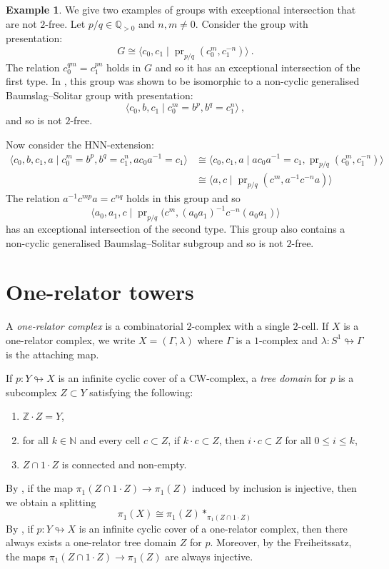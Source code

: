 \documentclass[11pt, a4paper]{amsart}
\theoremstyle{definition}
\newtheorem{example}[theorem]{Example}
\newcommand{\isom}{\cong}
\newcommand{\N}{\mathbb{N}}
\newcommand{\Z}{\mathbb{Z}}
\newcommand{\Q}{\mathbb{Q}}
\def\immerses{\looparrowright}
\DeclareMathOperator{\pr}{pr}
\begin{document}
\begin{example}
We give two examples of groups with exceptional intersection that are not $2$-free. Let $p/q\in \Q_{>0}$ and $n, m\neq 0$. Consider the group with presentation:
\[
G \isom \langle c_0, c_1 \mid \pr_{p/q}(c_0^{m}, c_1^{-n})\rangle~.
\]
The relation $c_0^{qm} = c_1^{pn}$ holds in $G$ and so it has an exceptional intersection of the first type. In \cite{meskin_73}, this group was shown to be isomorphic to a non-cyclic generalised Baumslag--Solitar group with presentation:
\[
\langle c_0, b, c_1 \mid c_0^{m} = b^{p}, b^{q} = c_1^{n}\rangle~,
\]
and so is not $2$-free.

Now consider the HNN-extension:
\begin{align*}
\langle c_0, b, c_1 , a\mid c_0^{m} = b^{p}, b^{q} = c_1^{n}, ac_0a^{-1} = c_1\rangle &\isom \langle c_0, c_1, a \mid ac_0a^{-1} = c_1, \pr_{p/q}(c_0^m, c_1^{-n}) \rangle \\
	&\isom \langle a, c \mid \pr_{p/q}(c^m, a^{-1}c^{-n}a)\rangle
\end{align*}
The relation $a^{-1}c^{mp}a = c^{nq}$ holds in this group and so
\[
\langle a_0, a_1, c \mid \pr_{p/q}(c^m, (a_0a_1)^{-1}c^{-n}(a_0a_1)\rangle
\]
has an exceptional intersection of the second type. This group also contains a non-cyclic generalised Baumslag--Solitar subgroup and so is not $2$-free.
\end{example}


\section{One-relator towers}


A \emph{one-relator complex} is a combinatorial $2$-complex with a single $2$-cell. If $X$ is a one-relator complex, we write $X = (\Gamma, \lambda)$ where $\Gamma$ is a $1$-complex and $\lambda:S^1\immerses \Gamma$ is the attaching map.

If $p:Y\immerses X$ is an infinite cyclic cover of a CW-complex, a \emph{tree domain} for $p$ is a subcomplex $Z\subset Y$ satisfying the following:
\begin{enumerate}
\item $\Z\cdot Z = Y$,
\item for all $k\in \N$ and every cell $c\subset Z$, if $k\cdot c\subset Z$, then $i\cdot c\subset Z$ for all $0\leq i\leq k$,
\item $Z\cap 1\cdot Z$ is connected and non-empty.
\end{enumerate}
By \cite[Proposition 3.10]{me_22}, if the map $\pi_1(Z\cap 1\cdot Z)\to \pi_1(Z)$ induced by inclusion is injective, then we obtain a splitting
\[
\pi_1(X)\isom \pi_1(Z)*_{\pi_1(Z\cap 1\cdot Z)}
\]
By \cite[Proposition 4.7]{me_22}, if $p:Y\immerses X$ is an infinite cyclic cover of a one-relator complex, then there always exists a one-relator tree domain $Z$ for $p$. Moreover, by the Freiheitssatz, the maps $\pi_1(Z\cap 1\cdot Z)\to\pi_1(Z)$ are always injective.
\end{document}
